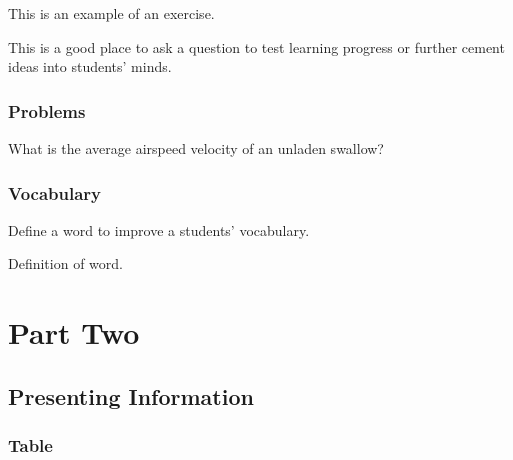\documentclass[11pt,fleqn]{book} %
\begin{document}
This is an example of an exercise.

\begin{exercise}
This is a good place to ask a question to test learning progress or further cement ideas into students' minds.
\end{exercise}


\section{Problems}

\begin{problem}
What is the average airspeed velocity of an unladen swallow?
\end{problem}


\section{Vocabulary}

Define a word to improve a students' vocabulary.

\begin{vocabulary}[Word]
Definition of word.
\end{vocabulary}


\part{Part Two}



\chapter{Presenting Information}

\section{Table}
\end{document}

